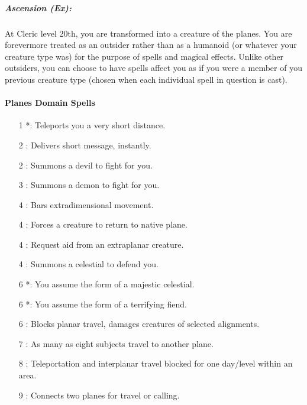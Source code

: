 % 
\subparagraph{Ascension (Ex):}
At Cleric level 20th, you are transformed into a creature of the planes.
You are forevermore treated as an outsider rather than as a humanoid (or whatever your creature type was) for the purpose of spells and magical effects.
Unlike other outsiders, you can choose to have spells affect you as if you were a member of you previous creature type (chosen when each individual spell in question is cast).
\paragraph{Planes Domain Spells}
\begin{itemize}
\item[1] *: Teleports you a very short distance.
\item[2] : Delivers short message, instantly.
\item[2] : Summons a devil to fight for you.
\item[3] : Summons a demon to fight for you.
\item[4] : Bars extradimensional movement.
\item[4] : Forces a creature to return to native plane.
\item[4] : Request aid from an extraplanar creature.
\item[4] : Summons a celestial to defend you.
\item[6] *: You assume the form of a majestic celestial.
\item[6] *: You assume the form of a terrifying fiend.
\item[6] : Blocks planar travel, damages creatures of selected alignments.
\item[7] : As many as eight subjects travel to another plane.
\item[8] : Teleportation and interplanar travel blocked for one day/level within an area.
\item[9] : Connects two planes for travel or calling.
\end{itemize}

